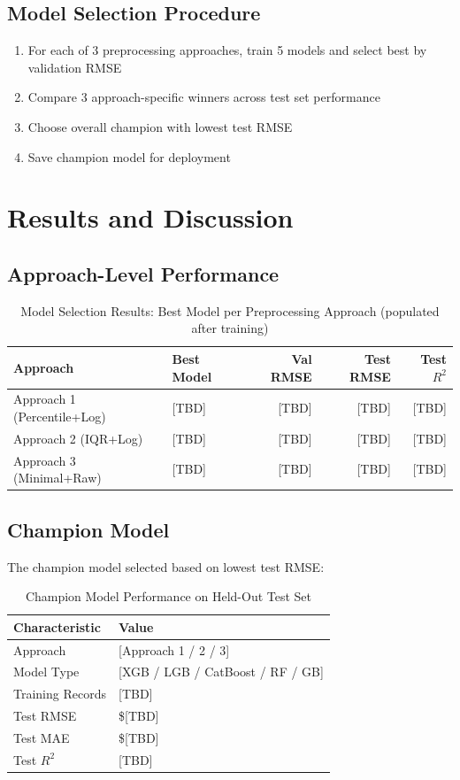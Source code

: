 \documentclass[12pt,a4paper]{article}
\begin{document}
\subsection{Model Selection Procedure}

\begin{enumerate}
    \item For each of 3 preprocessing approaches, train 5 models and select best by validation RMSE
    \item Compare 3 approach-specific winners across test set performance
    \item Choose overall champion with lowest test RMSE
    \item Save champion model for deployment
\end{enumerate}

\section{Results and Discussion}

\subsection{Approach-Level Performance}

\begin{table}[H]
\centering\small
\begin{tabular}{llrrr}
\toprule
\textbf{Approach} & \textbf{Best Model} & \textbf{Val RMSE} & \textbf{Test RMSE} & \textbf{Test $R^2$} \\
\midrule
Approach 1 (Percentile+Log) & [TBD] & [TBD] & [TBD] & [TBD] \\
Approach 2 (IQR+Log) & [TBD] & [TBD] & [TBD] & [TBD] \\
Approach 3 (Minimal+Raw) & [TBD] & [TBD] & [TBD] & [TBD] \\
\bottomrule
\end{tabular}
\caption{Model Selection Results: Best Model per Preprocessing Approach (populated after training)}
\end{table}

\subsection{Champion Model}

The champion model selected based on lowest test RMSE:

\begin{table}[H]
\centering\small
\begin{tabular}{ll}
\toprule
\textbf{Characteristic} & \textbf{Value} \\
\midrule
Approach & [Approach 1 / 2 / 3] \\
Model Type & [XGB / LGB / CatBoost / RF / GB] \\
Training Records & [TBD] \\
Test RMSE & \$[TBD] \\
Test MAE & \$[TBD] \\
Test $R^2$ & [TBD] \\
\bottomrule
\end{tabular}
\caption{Champion Model Performance on Held-Out Test Set}
\end{table}
\end{document}
